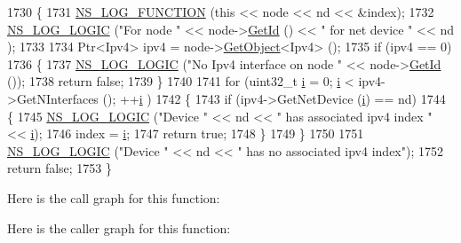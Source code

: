 \begin{DoxyCode}
1730 \{
1731   \hyperlink{log-macros-disabled_8h_a90b90d5bad1f39cb1b64923ea94c0761}{NS\_LOG\_FUNCTION} (\textcolor{keyword}{this} << node << nd << &index);
1732   \hyperlink{group__logging_ga88acd260151caf2db9c0fc84997f45ce}{NS\_LOG\_LOGIC} (\textcolor{stringliteral}{"For node "} << node->\hyperlink{classns3_1_1Node_aaf49b64a843565ce3812326313b370ac}{GetId} () << \textcolor{stringliteral}{" for net device "} << nd );
1733 
1734   Ptr<Ipv4> ipv4 = node->\hyperlink{classns3_1_1Object_a13e18c00017096c8381eb651d5bd0783}{GetObject}<Ipv4> ();
1735   \textcolor{keywordflow}{if} (ipv4 == 0)
1736     \{
1737       \hyperlink{group__logging_ga88acd260151caf2db9c0fc84997f45ce}{NS\_LOG\_LOGIC} (\textcolor{stringliteral}{"No Ipv4 interface on node "} << node->\hyperlink{classns3_1_1Node_aaf49b64a843565ce3812326313b370ac}{GetId} ());
1738       \textcolor{keywordflow}{return} \textcolor{keyword}{false};
1739     \}
1740 
1741   \textcolor{keywordflow}{for} (uint32\_t \hyperlink{bernuolliDistribution_8m_a6f6ccfcf58b31cb6412107d9d5281426}{i} = 0; \hyperlink{bernuolliDistribution_8m_a6f6ccfcf58b31cb6412107d9d5281426}{i} < ipv4->GetNInterfaces (); ++\hyperlink{bernuolliDistribution_8m_a6f6ccfcf58b31cb6412107d9d5281426}{i} )
1742     \{
1743       \textcolor{keywordflow}{if} (ipv4->GetNetDevice (\hyperlink{bernuolliDistribution_8m_a6f6ccfcf58b31cb6412107d9d5281426}{i}) == nd)
1744         \{
1745           \hyperlink{group__logging_ga88acd260151caf2db9c0fc84997f45ce}{NS\_LOG\_LOGIC} (\textcolor{stringliteral}{"Device "} << nd << \textcolor{stringliteral}{" has associated ipv4 index "} << 
      \hyperlink{bernuolliDistribution_8m_a6f6ccfcf58b31cb6412107d9d5281426}{i});
1746           index = \hyperlink{bernuolliDistribution_8m_a6f6ccfcf58b31cb6412107d9d5281426}{i};
1747           \textcolor{keywordflow}{return} \textcolor{keyword}{true};
1748         \}
1749     \}
1750 
1751   \hyperlink{group__logging_ga88acd260151caf2db9c0fc84997f45ce}{NS\_LOG\_LOGIC} (\textcolor{stringliteral}{"Device "} << nd << \textcolor{stringliteral}{" has no associated ipv4 index"});
1752   \textcolor{keywordflow}{return} \textcolor{keyword}{false};
1753 \}
\end{DoxyCode}


Here is the call graph for this function\+:




Here is the caller graph for this function\+:


